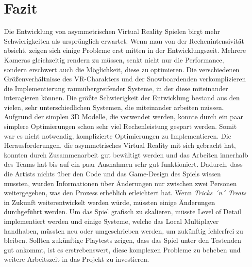 \chapter{Fazit}
Die Entwicklung von asymmetrischen Virtual Reality Spielen birgt mehr Schwierigkeiten als ursprünglich erwartet. Wenn man von der Rechenintensivität absieht, zeigen sich einige Probleme erst mitten in der Entwicklungszeit. Mehrere Kameras gleichzeitig rendern zu müssen, senkt nicht nur die Performance, sondern erschwert auch die Möglichkeit, diese zu optimieren. Die verschiedenen Größenverhältnisse des VR-Charakters und der Snowboardenden verkomplizieren die Implementierung raumübergreifender Systeme, in der diese miteinander interagieren können. Die größte Schwierigkeit der Entwicklung bestand aus den vielen, sehr unterschiedlichen Systemen, die miteinander arbeiten müssen. Aufgrund der simplen 3D Modelle, die verwendet werden, konnte durch ein paar simplere Optimierungen schon sehr viel Rechenleistung gespart werden. Somit war es nicht notwendig, komplizierte Optimierungen zu Implementieren. Die Herausforderungen, die asymmetrisches Virtual Reality mit sich gebracht hat, konnten durch Zusammenarbeit gut bewältigt werden und das Arbeiten innerhalb des Teams hat bis auf ein paar Ausnahmen sehr gut funktioniert. Dadurch, dass die Artists nichts über den Code und das Game-Design des Spiels wissen mussten, wurden Informationen über Änderungen nur zwischen zwei Personen weitergegeben, was den Prozess erheblich erleichtert hat. Wenn \emph{Tricks ´n´ Treats} in Zukunft weiterentwickelt werden würde, müssten einige Änderungen durchgeführt werden. Um das Spiel grafisch zu skalieren, müsste Level of Detail implementiert werden und einige Systeme, welche das Local Multiplayer handhaben, müssten neu oder umgeschrieben werden, um zukünftig fehlerfrei zu bleiben. Sollten zukünftige Playtests zeigen, dass das Spiel unter den Testenden gut ankommt, ist es erstrebenswert, diese komplexen Probleme zu beheben und weitere Arbeitszeit in das Projekt zu investieren.
